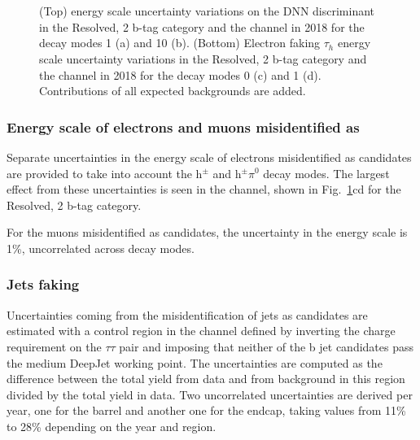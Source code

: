 \documentclass[../main.tex]{subfiles}
\begin{document}
\begin{figure}[h!]
\begin{center}
\\
\\
\end{center}
\caption[Tau energy scale uncertainties]{(Top) \tauh{} energy scale uncertainty variations on the DNN discriminant in the Resolved, 2 b-tag category and the \tauh\tauh{} channel in 2018 for the decay modes 1 (a) and 10 (b). (Bottom) Electron faking $\tau_h$ energy scale uncertainty variations in the Resolved, 2 b-tag category and the \taue\tauh{} channel in 2018 for the decay modes 0 (c) and 1 (d). Contributions of all expected backgrounds are added.}
\label{hh:fig:tes_syst}
\end{figure}


\subsubsection*{Energy scale of electrons and muons misidentified as \tauh{}}

Separate uncertainties in the energy scale of electrons misidentified as \tauh{} candidates are provided to take into account the h${}^\pm$ and h${}^\pm\pi^0$ decay modes. The largest effect from these uncertainties is seen in the \tauh\tauh{} channel, shown in Fig.~\ref{hh:fig:tes_syst}cd for the Resolved, 2 b-tag category.

For the muons misidentified as \tauh{} candidates, the uncertainty in the energy scale is 1\%, uncorrelated across decay modes.

\subsubsection*{Jets faking \tauh}

Uncertainties coming from the misidentification of jets as \tauh{} candidates are estimated with a control region in the \taumu\tauh{} channel defined by inverting the charge requirement on the $\tau\tau$ pair and imposing that neither of the b jet candidates pass the medium DeepJet working point. The uncertainties are computed as the difference between the total yield from data and from background in this region divided by the total yield in data. Two uncorrelated uncertainties are derived per year, one for the barrel and another one for the endcap, taking values from 11\% to 28\% depending on the year and region.
\end{document}
